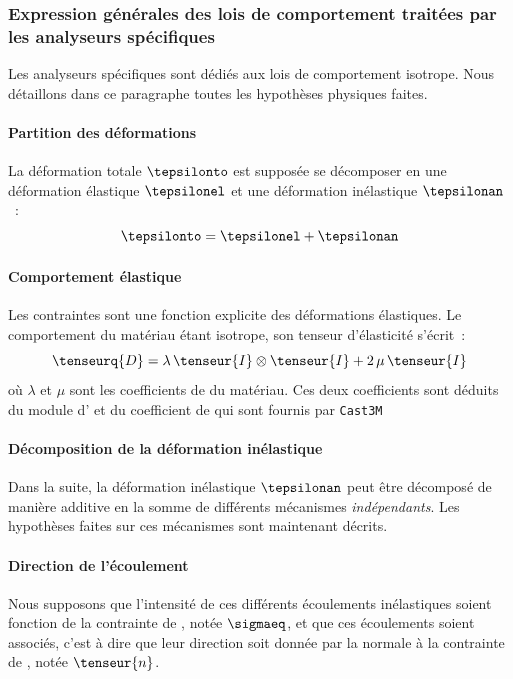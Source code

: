 \documentclass[rectoverso,pleiades,pstricks,leqno,anti]{texmf/note_technique_2010}
\newcommand{\castem}{\texttt{Cast3M}}
\begin{document}
\subsubsection{Expression générales des lois de comportement traitées
  par les analyseurs spécifiques}

Les analyseurs spécifiques sont dédiés aux lois de comportement
isotrope. Nous détaillons dans ce paragraphe toutes les hypothèses
physiques faites.

\paragraph{Partition des déformations} La déformation totale
\(\tepsilonto\) est supposée se décomposer en une déformation élastique
\(\tepsilonel\) et une déformation inélastique \(\tepsilonan\)~:
\[
\tepsilonto = \tepsilonel + \tepsilonan
\]

\paragraph{Comportement élastique} Les contraintes sont une fonction
explicite des déformations élastiques. Le comportement du matériau
étant isotrope, son tenseur d'élasticité s'écrit~:
\[
\tenseurq{D}=\lambda\,\tenseur{I}\otimes\tenseur{I}+2\,\mu\,\tenseur{I}
\]
où \(\lambda\) et \(\mu\) sont les coefficients de  du
matériau. Ces deux coefficients sont déduits du module d' et
du coefficient de  qui sont fournis par \castem{}

\paragraph{Décomposition de la déformation inélastique} Dans la suite,
la déformation inélastique \(\tepsilonan\) peut être décomposé de
manière additive en la somme de différents mécanismes {\em
  indépendants}. Les hypothèses faites sur ces mécanismes sont
maintenant décrits.

\paragraph{Direction de l'écoulement} Nous supposons que l'intensité de
ces différents écoulements inélastiques soient fonction de la contrainte
de , notée \(\sigmaeq\), et que ces écoulements soient
associés, c'est à dire que leur direction soit donnée par la normale à
la contrainte de , notée \(\tenseur{n}\).
\end{document}
